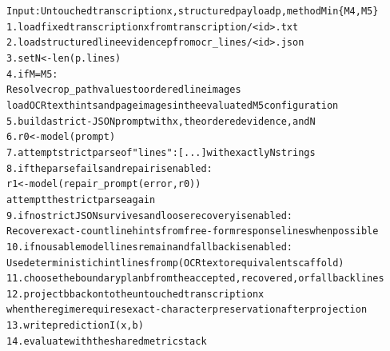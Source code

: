 \begin{table}[t]
  \centering
  \caption{Shared pseudocode for the structured M4/M5 pipeline. Step~3 reflects the current handwritten implementation: The expected line count is read from disk rather than predicted from the page.}
  \label{tab:app_structured_pseudocode}
  \begin{minipage}{0.94\linewidth}
    \footnotesize
\begin{alltt}
Input: Untouched transcription x, structured payload p, method M in \{M4, M5\}
1. load fixed transcription x from transcription/<id>.txt
2. load structured line evidence p from ocr_lines/<id>.json
3. set N <- len(p.lines)   %
4. if M = M5:
     Resolve crop_path values to ordered line images
     load OCR text hints and page images in the evaluated M5 configuration
5. build a strict-JSON prompt with x, the ordered evidence, and N
6. r0 <- model(prompt)
7. attempt strict parse of {"lines": [...]} with exactly N strings
8. if the parse fails and repair is enabled:
     r1 <- model(repair_prompt(error, r0))
     attempt the strict parse again
9. if no strict JSON survives and loose recovery is enabled:
     Recover exact-count line hints from free-form response lines when possible
10. if no usable model lines remain and fallback is enabled:
      Use deterministic hint lines from p (OCR text or equivalent scaffold)
11. choose the boundary plan b from the accepted, recovered, or fallback lines
12. project b back onto the untouched transcription x
    when the regime requires exact-character preservation after projection
13. write prediction I(x,b)
14. evaluate with the shared metric stack
\end{alltt}
  \end{minipage}
\end{table}

